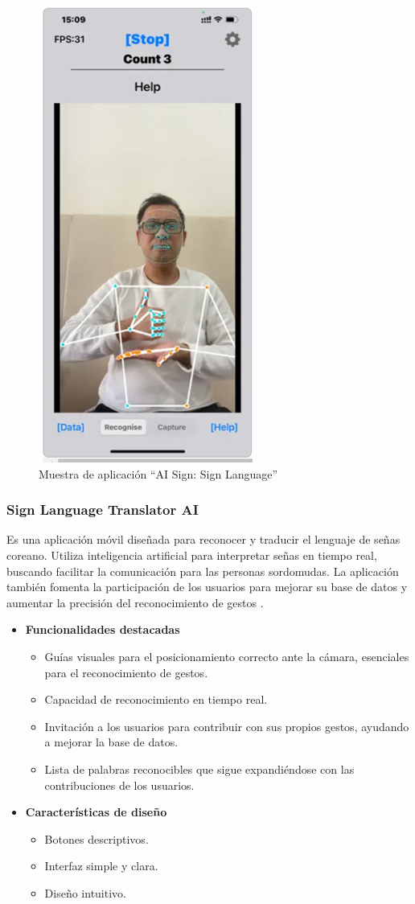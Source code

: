 \begin{figure} [H]
    \centering
    \includegraphics[width=0.25\linewidth]{figuras/ai_sign.png}
    \caption{Muestra de aplicación “AI Sign: Sign Language”}
    \label{fig:enter-label}
\end{figure}

\subsubsection{Sign Language Translator AI}

Es una aplicación móvil diseñada para reconocer y traducir el lenguaje de señas coreano. Utiliza inteligencia artificial para interpretar señas en tiempo real, buscando facilitar la comunicación para las personas sordomudas. La aplicación también fomenta la participación de los usuarios para mejorar su base de datos y aumentar la precisión del reconocimiento de gestos \cite{SignLanguageTranslatorAI}.

\begin{itemize}
    \item \textbf{Funcionalidades destacadas}
    \begin{itemize}
        \item Guías visuales para el posicionamiento correcto ante la cámara, esenciales para el reconocimiento de gestos.
        \item Capacidad de reconocimiento en tiempo real.
        \item Invitación a los usuarios para contribuir con sus propios gestos, ayudando a mejorar la base de datos.
        \item Lista de palabras reconocibles que sigue expandiéndose con las contribuciones de los usuarios.
    \end{itemize}

    \item \textbf{Características de diseño}
    \begin{itemize}
        \item Botones descriptivos.
        \item Interfaz simple y clara.
        \item Diseño intuitivo.
    \end{itemize}
\end{itemize}


